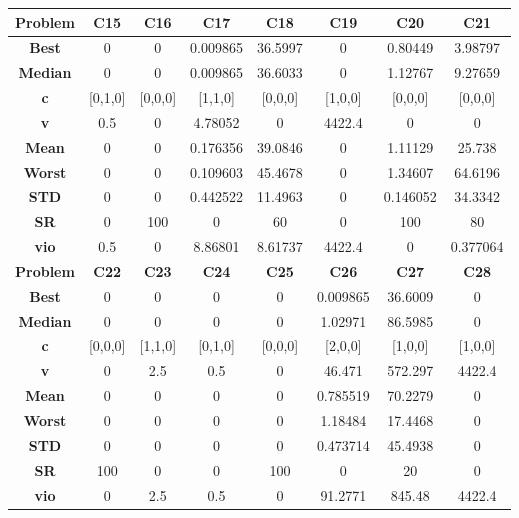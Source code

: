 \documentclass{IEEEtran}
\begin{document}
\begin{center}
\begin{tabular}{|c|c|c|c|c|c|c|c|}
    \hline 
    \hline 
    \textbf{Problem} & \textbf{C15} & \textbf{C16} & \textbf{C17} & \textbf{C18} & \textbf{C19} & \textbf{C20} & \textbf{C21} \\ 
    \hline\hline 
    \textbf{Best} & 0 & 0 & 0.009865 & 36.5997 & 0 & 0.80449 & 3.98797\\ 
    \textbf{Median} & 0 & 0 & 0.009865 & 36.6033 & 0 & 1.12767 & 9.27659\\ 
    \textbf{c} & [0,1,0] & [0,0,0] & [1,1,0] & [0,0,0] & [1,0,0] & [0,0,0] & [0,0,0]\\ 
    \textbf{v} & 0.5 & 0 & 4.78052 & 0 & 4422.4 & 0 & 0\\ 
    \textbf{Mean} & 0 & 0 & 0.176356 & 39.0846 & 0 & 1.11129 & 25.738\\ 
    \textbf{Worst} & 0 & 0 & 0.109603 & 45.4678 & 0 & 1.34607 & 64.6196\\ 
    \textbf{STD} & 0 & 0 & 0.442522 & 11.4963 & 0 & 0.146052 & 34.3342\\ 
    \textbf{SR} & 0 & 100 & 0 & 60 & 0 & 100 & 80\\ 
    \textbf{vio} & 0.5 & 0 & 8.86801 & 8.61737 & 4422.4 & 0 & 0.377064\\ 
    \hline 
    \hline 
    \textbf{Problem} & \textbf{C22} & \textbf{C23} & \textbf{C24} & \textbf{C25} & \textbf{C26} & \textbf{C27} & \textbf{C28} \\ 
    \hline\hline 
    \textbf{Best} & 0 & 0 & 0 & 0 & 0.009865 & 36.6009 & 0\\ 
    \textbf{Median} & 0 & 0 & 0 & 0 & 1.02971 & 86.5985 & 0\\ 
    \textbf{c} & [0,0,0] & [1,1,0] & [0,1,0] & [0,0,0] & [2,0,0] & [1,0,0] & [1,0,0]\\ 
    \textbf{v} & 0 & 2.5 & 0.5 & 0 & 46.471 & 572.297 & 4422.4\\ 
    \textbf{Mean} & 0 & 0 & 0 & 0 & 0.785519 & 70.2279 & 0\\ 
    \textbf{Worst} & 0 & 0 & 0 & 0 & 1.18484 & 17.4468 & 0\\ 
    \textbf{STD} & 0 & 0 & 0 & 0 & 0.473714 & 45.4938 & 0\\ 
    \textbf{SR} & 100 & 0 & 0 & 100 & 0 & 20 & 0\\ 
    \textbf{vio} & 0 & 2.5 & 0.5 & 0 & 91.2771 & 845.48 & 4422.4\\ 
    \hline 
  \end{tabular}
\end{center}
\newpage
\end{document}
